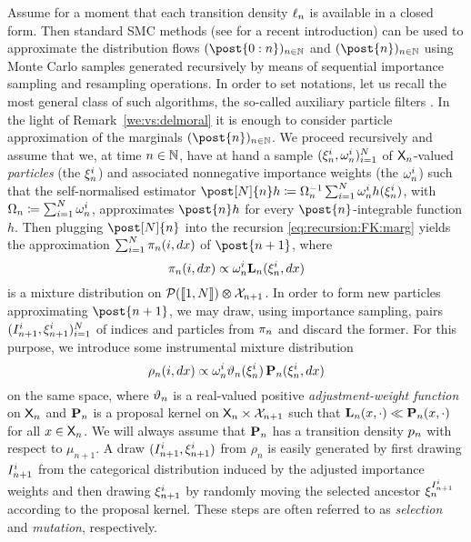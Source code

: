 Assume for a moment that each transition density $\ell_{n}$ is available in a closed form. Then standard SMC methods (see \cite{chopin:papaspiliopoulos:2020} for a recent introduction) can be used to approximate the distribution flows $(\post{0:n})_{n \in \nset}$ and $(\post{n})_{n \in \nset}$ using Monte Carlo samples generated recursively by means of sequential importance sampling and resampling operations. In order to set notations, let us recall the most general class of such algorithms, the so-called auxiliary particle filters \cite{pitt:shephard:1999}. In the light of Remark~\ref{we:vs:delmoral} it is enough to consider particle approximation of the marginals $(\post{n})_{n \in \nset}$. We proceed recursively and assume that we, at time $n \in \mathbb{N}$, have at hand a sample $(\xi_{n}^{i}, \omega_{n}^{i})_{i = 1}^N$ of $\mathsf{X}_n$-valued \emph{particles} (the $\xi_{n}^{i}$) and associated nonnegative importance weights (the $\omega_{n}^{i}$) such that the self-normalised estimator $\post[\N]{n} h \eqdef \sumwght{n}^{-1} \sum_{i = 1}^\N \ewght{n}{i} h(\epart{n}{i})$, with $\sumwght{n} \eqdef \sum_{i = 1}^\N \ewght{n}{i}$, approximates $\post{n} h$ for every $\post{n}$-integrable function $h$. Then plugging $\post[\N]{n}$ into the recursion \eqref{eq:recursion:FK:marg} yields the approximation $\sum_{i = 1}^N \pi_n(i, d x)$ of $\post{n + 1}$, where 
\begin{equation} \label{eq:def:partmixt}
\partmixt_n(i, \rmd x) \propto \ewght{n}{i} \uk{n}(\epart{n}{i}, \rmd x)
\end{equation}
is a mixture distribution on $\mathcal{P}(\llbracket 1, N \rrbracket) \varotimes \mathcal{X}_{n + 1}$. In order to form new particles approximating $\post{n + 1}$, we may draw, using importance sampling, pairs $(I_{n + 1}^{i}, \xi_{n + 1}^{i})_{i = 1}^N$ of indices and particles from $\pi_n$ and discard the former. For this purpose, we introduce some instrumental mixture distribution 
\begin{equation} \label{eq:cond:instrumental:mixture}
\rho_n(i, \rmd x) \propto \ewght{n}{i} \adjfuncforward{n}(\epart{n}{i}) \, \prop{n}(\epart{n}{i}, \rmd x)
\end{equation}
on the same space, where $\vartheta_{n}$ is a real-valued positive \emph{adjustment-weight function} on $\mathsf{X}_n$ and $\mathbf{P}_{n}$ is a proposal kernel on $\mathsf{X}_n \times \mathcal{X}_{n + 1}$ such that $\mathbf{L}_{n}(x, \cdot) \ll \mathbf{P}_{n}(x, \cdot)$ for all $x \in \mathsf{X}_n$. We will always assume that $\mathbf{P}_{n}$ has a transition density $p_{n}$ with respect to $\mu_{n + 1}$. A draw $(I_{n + 1}^{i}, \xi_{n + 1}^{i})$ from $\rho_n$ is easily generated by first drawing $I_{n + 1}^{i}$ from the categorical distribution induced by the adjusted importance weights and then drawing $\xi_{n + 1}^{i}$ by randomly moving the selected ancestor $\xi_{n}^{{I_{n + 1}^{i}}}$ according to the proposal kernel. These steps are often referred to as \emph{selection} and \emph{mutation}, respectively. 
